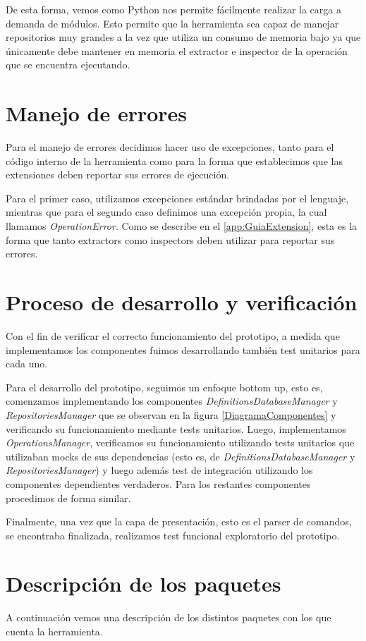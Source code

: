 De esta forma, vemos como Python nos permite fácilmente realizar la carga a demanda de módulos. Esto permite que la herramienta sea capaz de manejar repositorios muy grandes a la vez que utiliza un consumo de memoria bajo ya que únicamente debe mantener en memoria el extractor e inspector de la operación que se encuentra ejecutando.

\section{Manejo de errores}
Para el manejo de errores decidimos hacer uso de excepciones, tanto para el código interno de la herramienta como para la forma que establecimos que las extensiones deben reportar sus errores de ejecución.

Para el primer caso, utilizamos excepciones estándar brindadas por el lenguaje, mientras que para el segundo caso definimos una excepción propia, la cual llamamos \emph{OperationError}. Como se describe en el \autoref{app:GuiaExtension}, esta es la forma que tanto extractors como inspectors deben utilizar para reportar sus errores.

\section{Proceso de desarrollo y verificación} \label{procesoDesarrollo}
Con el fin de verificar el correcto funcionamiento del prototipo, a medida que implementamos los componentes fuimos desarrollando también test unitarios para cada uno.

Para el desarrollo del prototipo, seguimos un enfoque bottom up, esto es, comenzamos implementando los componentes \emph{DefinitionsDatabaseManager} y \emph{RepositoriesManager} que se observan en la figura \ref{DiagramaComponentes} y verificando su funcionamiento mediante tests unitarios. Luego, implementamos \emph{OperationsManager}, verificamos su funcionamiento utilizando tests unitarios que utilizaban mocks de sus dependencias (esto es, de \emph{DefinitionsDatabaseManager} y \emph{RepositoriesManager}) y luego además test de integración utilizando los componentes dependientes verdaderos. Para los restantes componentes procedimos de forma similar.

Finalmente, una vez que la capa de presentación, esto es el parser de comandos, se encontraba finalizada, realizamos test funcional exploratorio del prototipo.

\section{Descripción de los paquetes}
A continuación vemos una descripción de los distintos paquetes con los que cuenta la herramienta.
\newline

